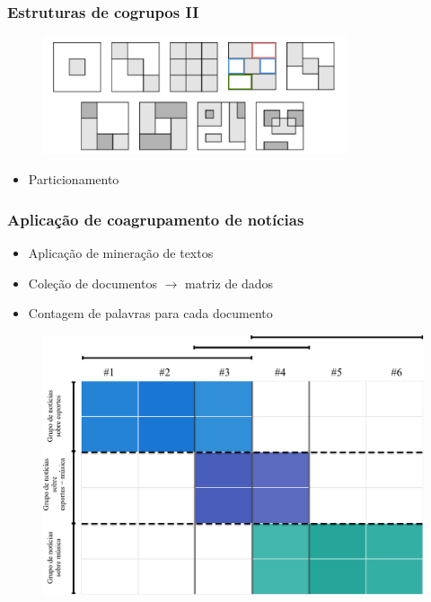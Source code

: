 \documentclass[10pt]{beamer}
\begin{document}
\begin{frame}
  \frametitle{Estruturas de cogrupos II}

  \begin{figure}[H]
    \centering
      \includegraphics[width=0.8\textwidth]{img/synteticBiclusters-v2.png}
  \end{figure}

  \begin{itemize}
    \item Particionamento
  \end{itemize}
\end{frame}


\begin{frame}
  \frametitle{Aplicação de coagrupamento de notícias}

  \begin{itemize}
        \item Aplicação de mineração de textos
        \item Coleção de documentos $\rightarrow$ matriz de dados
        \item Contagem de palavras para cada documento
      \end{itemize}

  \begin{figure} [htpb]
    \centering
    \includegraphics[scale=0.22]{img/sistema2.png}
  \end{figure}
\end{frame}
\end{document}
